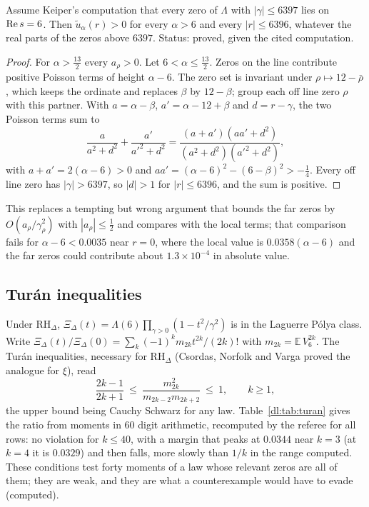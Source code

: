 \begin{proposition}\label{dl:prop:window}
Assume Keiper's computation \cite{NCKeiper96} that every zero of $\Lambda$ with $|\gamma|\le6397$ lies on $\operatorname{Re} s=6$. Then $\tilde u_\alpha(r)>0$ for every $\alpha>6$ and every $|r|\le6396$, whatever the real parts of the zeros above $6397$. Status: proved, given the cited computation.
\end{proposition}

\begin{proof}
For $\alpha>\frac{13}2$ every $a_\rho>0$. Let $6<\alpha\le\frac{13}2$. Zeros on the line contribute positive Poisson terms of height $\alpha-6$. The zero set is invariant under $\rho\mapsto12-\bar\rho$, which keeps the ordinate and replaces $\beta$ by $12-\beta$; group each off line zero $\rho$ with this partner. With $a=\alpha-\beta$, $a'=\alpha-12+\beta$ and $d=r-\gamma$, the two Poisson terms sum to
\[
\frac a{a^2+d^2}+\frac{a'}{a'^2+d^2}=\frac{(a+a')(aa'+d^2)}{(a^2+d^2)(a'^2+d^2)},
\]
with $a+a'=2(\alpha-6)>0$ and $aa'=(\alpha-6)^2-(6-\beta)^2>-\frac14$. Every off line zero has $|\gamma|>6397$, so $|d|>1$ for $|r|\le6396$, and the sum is positive.
\end{proof}

This replaces a tempting but wrong argument that bounds the far zeros by $O(a_\rho/\gamma_\rho^2)$ with $|a_\rho|\le\frac12$ and compares with the local terms; that comparison fails for $\alpha-6<0.0035$ near $r=0$, where the local value is $0.0358(\alpha-6)$ and the far zeros could contribute about $1.3\times10^{-4}$ in absolute value.

\subsection{Tur\'an inequalities}

Under $\mathrm{RH}_\Delta$, $\Xi_\Delta(t)=\Lambda(6)\prod_{\gamma>0}(1-t^2/\gamma^2)$ is in the Laguerre P\'olya class. Write $\Xi_\Delta(t)/\Xi_\Delta(0)=\sum_k(-1)^km_{2k}t^{2k}/(2k)!$ with $m_{2k}=\mathbb E\,V_6^{2k}$. The Tur\'an inequalities, necessary for $\mathrm{RH}_\Delta$ (Csordas, Norfolk and Varga \cite{CNV86} proved the analogue for $\xi$), read
\begin{equation}\label{dl:eq:turan}
\frac{2k-1}{2k+1}\ \le\ \frac{m_{2k}^2}{m_{2k-2}m_{2k+2}}\ \le\ 1,\qquad k\ge1,
\end{equation}
the upper bound being Cauchy Schwarz for any law. Table~\ref{dl:tab:turan} gives the ratio from moments in $60$ digit arithmetic, recomputed by the referee for all rows: no violation for $k\le40$, with a margin that peaks at $0.0344$ near $k=3$ (at $k=4$ it is $0.0329$) and then falls, more slowly than $1/k$ in the range computed. These conditions test forty moments of a law whose relevant zeros are all of them; they are weak, and they are what a counterexample would have to evade (computed).

